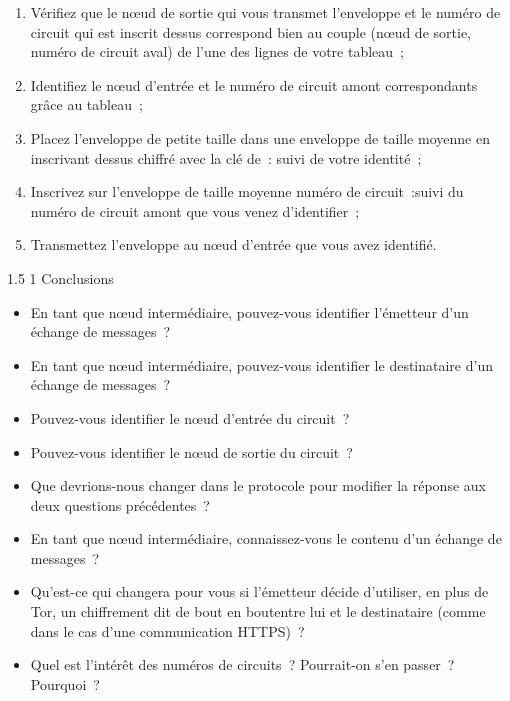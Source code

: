 \documentclass[a4paper,twoside,french]{article}
\makeatletter
\renewcommand\section{\@startsection
  {section}{1}{1cm}%
  {1.5\baselineskip}%
  {1\baselineskip}%
  {\normalfont\Large\bfseries}}%
\makeatother
\begin{document}
  \begin{enumerate}
  \item Vérifiez que le n\oe ud de sortie qui vous transmet
    l'enveloppe et le numéro de circuit qui est inscrit dessus
    correspond bien au couple (n\oe ud de sortie, numéro de circuit
    aval) de l'une des lignes de votre tableau~;
  \item Identifiez le n\oe ud d'entrée et le numéro de circuit amont
    correspondants grâce au tableau~;
  \item Placez l'enveloppe de petite taille dans une enveloppe de
    taille moyenne en inscrivant dessus \og chiffré avec la clé de~:
    \fg suivi de votre identité~;
  \item Inscrivez sur l'enveloppe de taille moyenne \og numéro de
    circuit~:\fg suivi du numéro de circuit amont que vous venez
    d'identifier~;
  \item Transmettez l'enveloppe au n\oe ud d'entrée que vous avez
    identifié.
  \end{enumerate}

  \section{Conclusions}

  \begin{itemize}
  \item En tant que n\oe ud intermédiaire, pouvez-vous identifier
    l'émetteur d'un échange de messages~?
  \item En tant que n\oe ud intermédiaire, pouvez-vous identifier
    le destinataire d'un échange de messages~?
  \item Pouvez-vous identifier le n\oe ud d'entrée du circuit~?
  \item Pouvez-vous identifier le n\oe ud de sortie du circuit~?
  \item Que devrions-nous changer dans le protocole pour modifier la
    réponse aux deux questions précédentes~?
  \item En tant que n\oe ud intermédiaire, connaissez-vous le contenu
    d'un échange de messages~?
  \item Qu'est-ce qui changera pour vous si l'émetteur décide
    d'utiliser, en plus de Tor, un chiffrement dit \og de bout en
    bout\fg entre lui et le destinataire (comme dans le cas d'une
    communication HTTPS)~?
  \item Quel est l'intérêt des numéros de circuits~? Pourrait-on s'en
    passer~? Pourquoi~?
  \end{itemize}

  
		
\end{document}
